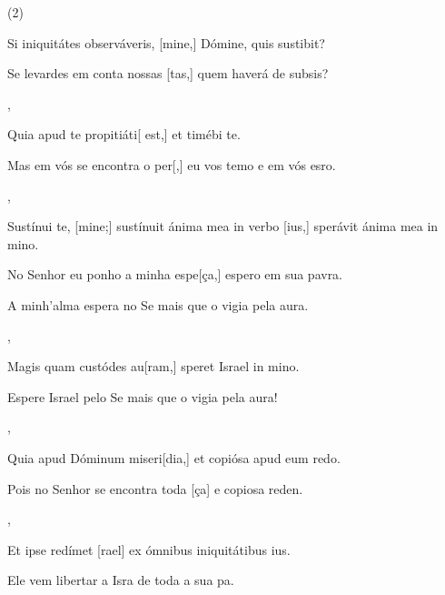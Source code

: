 \SetVersePairs(2){
  {\item {}Si iniquitátes observáveris, [mine,] Dómine, quis susti\-bit?~\Responsorium}%
    {\item {}Se levardes em conta nossas [tas,] quem haverá de subsis?~\Responsorium},
  {\item {}Quia apud te propitiáti[ est,] et timébi te.~\Responsorium}%
    {\item {}Mas em vós se encontra o per[,] eu vos temo e em vós esro.~\Responsorium},
  {\item {}Sustínui te, [mine;] sustínuit ánima mea in verbo [ius,] sperávit ánima mea in mino.~\Responsorium}%
    {\item {}No Senhor eu ponho a minha espe[ça,] espero em sua pavra.~\Responsorium
      \item {}A minh'alma espera no Se mais que o vigia pela aura.~\Responsorium},
  {\item {}Magis quam custódes au[ram,] speret Israel in mino.~\Responsorium}%
    {\item {}Espere Israel pelo Se mais que o vigia pela aura!~\Responsorium},
  {\item {}Quia apud Dóminum miseri[dia,] et copiósa apud eum redo.~\Responsorium}%
    {\item {}Pois no Senhor se encontra toda [ça] e copiosa reden.~\Responsorium},
  {\item {}Et ipse redímet [rael] ex ómnibus iniquitátibus ius.~\Responsorium}%
    {\item {}Ele vem libertar a Isra de toda a sua pa.~\Responsorium}
}
